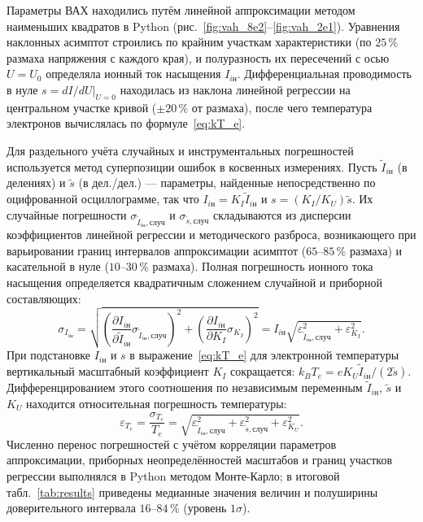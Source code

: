 \documentclass[reprint, amsmath, amssymb, aps, pra, nofootinbib]{revtex4-2}
\begin{document}
Параметры ВАХ находились путём линейной аппроксимации методом наименьших квадратов в Python (рис.~\ref{fig:vah_8e2}--\ref{fig:vah_2e1}). Уравнения наклонных асимптот строились по крайним участкам характеристики (по $25\,\%$ размаха напряжения с каждого края), и полуразность их пересечений с осью $U = U_0$ определяла ионный ток насыщения $I_{i\text{н}}$. Дифференциальная проводимость в нуле $s = \left.dI/dU\right|_{U=0}$ находилась из наклона линейной регрессии на центральном участке кривой ($\pm 20\,\%$ от размаха), после чего температура электронов вычислялась по формуле~\eqref{eq:kT_e}.

Для раздельного учёта случайных и инструментальных погрешностей используется метод суперпозиции ошибок в косвенных измерениях. Пусть $\tilde{I}_{i\text{н}}$ (в делениях) и $\tilde{s}$ (в дел./дел.) --- параметры, найденные непосредственно по оцифрованной осциллограмме, так что $I_{i\text{н}} = K_I \tilde{I}_{i\text{н}}$ и $s = (K_I / K_U)\tilde{s}$. Их случайные погрешности $\sigma_{\tilde{I}_{i\text{н}},\text{случ}}$ и $\sigma_{\tilde{s},\text{случ}}$ складываются из дисперсии коэффициентов линейной регрессии и методического разброса, возникающего при варьировании границ интервалов аппроксимации асимптот ($65$--$85\,\%$ размаха) и касательной в нуле ($10$--$30\,\%$ размаха). Полная погрешность ионного тока насыщения определяется квадратичным сложением случайной и приборной составляющих:
\begin{equation}
\sigma_{I_{i\text{н}}} = \sqrt{\left(\frac{\partial I_{i\text{н}}}{\partial \tilde{I}_{i\text{н}}}\sigma_{\tilde{I}_{i\text{н}},\text{случ}}\right)^2 + \left(\frac{\partial I_{i\text{н}}}{\partial K_I}\sigma_{K_I}\right)^2} = I_{i\text{н}}\sqrt{\varepsilon_{\tilde{I}_{i\text{н}},\text{случ}}^2 + \varepsilon_{K_I}^2}. \label{eq:err_Iin}
\end{equation}
При подстановке $I_{i\text{н}}$ и $s$ в выражение~\eqref{eq:kT_e} для электронной температуры вертикальный масштабный коэффициент $K_I$ сокращается: $k_B T_e = e K_U \tilde{I}_{i\text{н}} / (2\tilde{s})$. Дифференцированием этого соотношения по независимым переменным $\tilde{I}_{i\text{н}}$, $\tilde{s}$ и $K_U$ находится относительная погрешность температуры:
\begin{equation}
\varepsilon_{T_e} = \frac{\sigma_{T_e}}{T_e} = \sqrt{\varepsilon_{\tilde{I}_{i\text{н}},\text{случ}}^2 + \varepsilon_{\tilde{s},\text{случ}}^2 + \varepsilon_{K_U}^2}. \label{eq:err_Te}
\end{equation}
Численно перенос погрешностей с учётом корреляции параметров аппроксимации, приборных неопределённостей масштабов и границ участков регрессии выполнялся в Python методом Монте-Карло; в итоговой табл.~\ref{tab:results} приведены медианные значения величин и полуширины доверительного интервала $16$--$84\,\%$ (уровень $1\sigma$).
\end{document}
